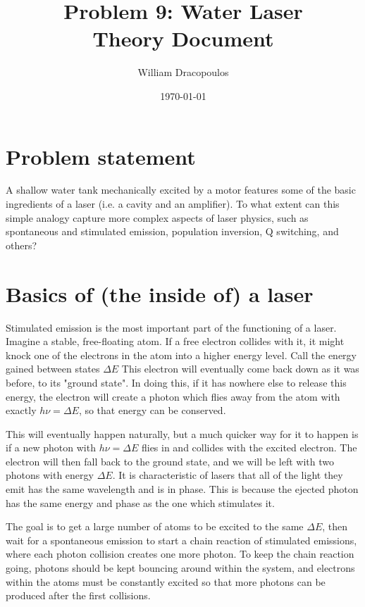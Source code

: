 \documentclass[12pt]{article}
\title{Problem 9: Water Laser \\ Theory Document}
\author{William Dracopoulos}
\date{\today}
\begin{document}
\maketitle

\section{Problem statement}\label{sec:problem}

A shallow water tank mechanically excited by a motor features some of the basic ingredients of a laser (i.e. a cavity and an amplifier). To what extent can this simple analogy capture more complex aspects of laser physics, such as spontaneous and stimulated emission, population inversion, Q switching, and others?

\section{Basics of (the inside of) a laser}\label{sec:basics}

Stimulated emission is the most important part of the functioning of a laser. Imagine a stable, free-floating atom. If a free electron collides with it, it might knock one of the electrons in the atom into a higher energy level. Call the energy gained between states $\Delta E$ This electron will eventually come back down as it was before, to its "ground state". In doing this, if it has nowhere else to release this energy, the electron will create a photon which flies away from the atom with exactly $h\nu = \Delta E$, so that energy can be conserved.

This will eventually happen naturally, but a much quicker way for it to happen is if a new photon with $h\nu = \Delta E$ flies in and collides with the excited electron. The electron will then fall back to the ground state, and we will be left with two photons with energy $\Delta E$. It is characteristic of lasers that all of the light they emit has the same wavelength and is in phase. This is because the ejected photon has the same energy and phase as the one which stimulates it.

The goal is to get a large number of atoms to be excited to the same $\Delta E$, then wait for a spontaneous emission to start a chain reaction of stimulated emissions, where each photon collision creates one more photon. To keep the chain reaction going, photons should be kept bouncing around within the system, and electrons within the atoms must be constantly excited so that more photons can be produced after the first collisions.
\end{document}
